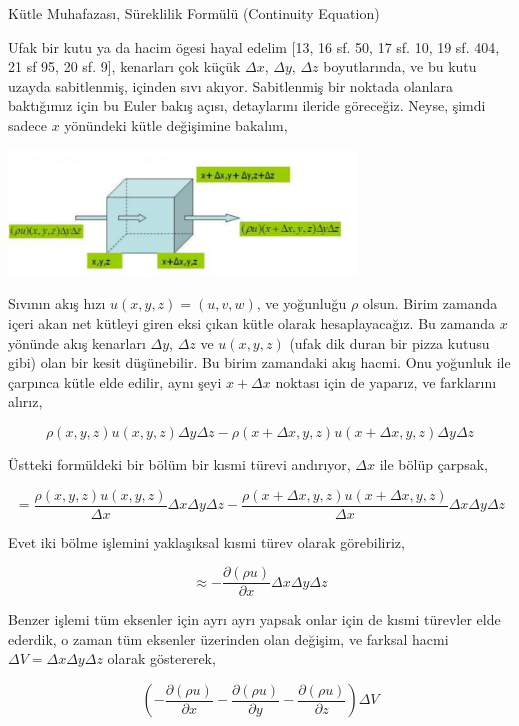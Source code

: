 \documentclass[12pt,fleqn]{article}\usepackage{../../common}
\begin{document}
Kütle Muhafazası, Süreklilik Formülü (Continuity Equation)

Ufak bir kutu ya da hacim ögesi hayal edelim [13, 16 sf. 50, 17 sf. 10, 19 sf. 404, 21
  sf 95, 20 sf. 9], kenarları çok küçük $\Delta x$, $\Delta y$, $\Delta z$
boyutlarında, ve bu kutu uzayda sabitlenmiş, içinden sıvı akıyor. Sabitlenmiş
bir noktada olanlara baktığımız için bu Euler bakış açısı, detaylarını ileride
göreceğiz. Neyse, şimdi sadece $x$ yönündeki kütle değişimine bakalım,

\includegraphics[width=25em]{phy_050_cons_03.png}

Sıvının akış hızı $u(x,y,z) = (u,v,w)$, ve yoğunluğu $\rho$ olsun. Birim zamanda
içeri akan net kütleyi giren eksi çıkan kütle olarak hesaplayacağız. Bu zamanda
$x$ yönünde akış kenarları $\Delta y$, $\Delta z$ ve $u(x,y,z)$ (ufak dik duran
bir pizza kutusu gibi) olan bir kesit düşünebilir. Bu birim zamandaki akış
hacmi.  Onu yoğunluk ile çarpınca kütle elde edilir, aynı şeyi $x + \Delta x$
noktası için de yaparız, ve farklarını alırız,

$$
\rho(x,y,z)u(x,y,z)\Delta y \Delta z -
\rho(x+\Delta x,y,z) u(x+\Delta x,y,z)\Delta y \Delta z
$$

Üstteki formüldeki bir bölüm bir kısmi türevi andırıyor, $\Delta x$ ile bölüp
çarpsak,

$$
= \frac{\rho(x,y,z)u(x,y,z)}{\Delta x}\Delta x \Delta y \Delta z -
\frac{\rho(x+\Delta x,y,z) u(x+\Delta x,y,z)}{\Delta x} \Delta x \Delta y \Delta z
$$

Evet iki bölme işlemini yaklaşıksal kısmi türev olarak görebiliriz,

$$
\approx -\frac{\partial (\rho u) }{\partial x} \Delta x \Delta y \Delta z
$$

Benzer işlemi tüm eksenler için ayrı ayrı yapsak onlar için de kısmi türevler
elde ederdik, o zaman tüm eksenler üzerinden olan değişim, ve farksal hacmi
$\Delta V = \Delta x \Delta y \Delta z$ olarak göstererek,

$$
\left(
-\frac{\partial (\rho u) }{\partial x} 
-\frac{\partial (\rho u) }{\partial y} 
-\frac{\partial (\rho u) }{\partial z} 
\right) \Delta V
$$
\end{document}
